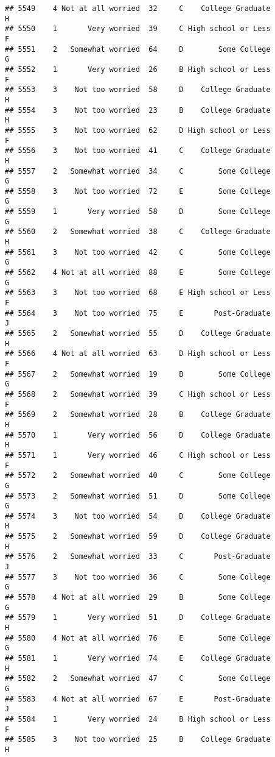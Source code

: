 \documentclass[
]{article}
\begin{document}
\begin{verbatim}
## 5549    4 Not at all worried  32     C    College Graduate         H
## 5550    1       Very worried  39     C High school or Less         F
## 5551    2   Somewhat worried  64     D        Some College         G
## 5552    1       Very worried  26     B High school or Less         F
## 5553    3    Not too worried  58     D    College Graduate         H
## 5554    3    Not too worried  23     B    College Graduate         H
## 5555    3    Not too worried  62     D High school or Less         F
## 5556    3    Not too worried  41     C    College Graduate         H
## 5557    2   Somewhat worried  34     C        Some College         G
## 5558    3    Not too worried  72     E        Some College         G
## 5559    1       Very worried  58     D        Some College         G
## 5560    2   Somewhat worried  38     C    College Graduate         H
## 5561    3    Not too worried  42     C        Some College         G
## 5562    4 Not at all worried  88     E        Some College         G
## 5563    3    Not too worried  68     E High school or Less         F
## 5564    3    Not too worried  75     E       Post-Graduate         J
## 5565    2   Somewhat worried  55     D    College Graduate         H
## 5566    4 Not at all worried  63     D High school or Less         F
## 5567    2   Somewhat worried  19     B        Some College         G
## 5568    2   Somewhat worried  39     C High school or Less         F
## 5569    2   Somewhat worried  28     B    College Graduate         H
## 5570    1       Very worried  56     D    College Graduate         H
## 5571    1       Very worried  46     C High school or Less         F
## 5572    2   Somewhat worried  40     C        Some College         G
## 5573    2   Somewhat worried  51     D        Some College         G
## 5574    3    Not too worried  54     D    College Graduate         H
## 5575    2   Somewhat worried  59     D    College Graduate         H
## 5576    2   Somewhat worried  33     C       Post-Graduate         J
## 5577    3    Not too worried  36     C        Some College         G
## 5578    4 Not at all worried  29     B        Some College         G
## 5579    1       Very worried  51     D    College Graduate         H
## 5580    4 Not at all worried  76     E        Some College         G
## 5581    1       Very worried  74     E    College Graduate         H
## 5582    2   Somewhat worried  47     C        Some College         G
## 5583    4 Not at all worried  67     E       Post-Graduate         J
## 5584    1       Very worried  24     B High school or Less         F
## 5585    3    Not too worried  25     B    College Graduate         H

\end{verbatim}
\end{document}
